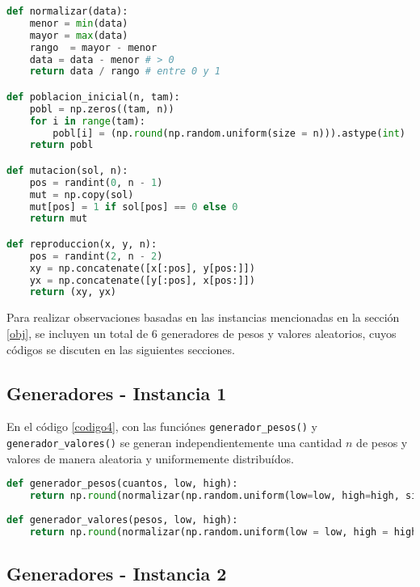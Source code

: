 \documentclass{article}
\begin{document}
\begin{lstlisting}[caption={Funciones Normalizar, Poblaci\'on Inicial, Mutaci\'on y Reproducci\'on}, label=codigo3, language=Python]
def normalizar(data):
    menor = min(data)
    mayor = max(data)
    rango  = mayor - menor
    data = data - menor # > 0
    return data / rango # entre 0 y 1

def poblacion_inicial(n, tam):
    pobl = np.zeros((tam, n))
    for i in range(tam):
        pobl[i] = (np.round(np.random.uniform(size = n))).astype(int)
    return pobl

def mutacion(sol, n):
    pos = randint(0, n - 1)
    mut = np.copy(sol)
    mut[pos] = 1 if sol[pos] == 0 else 0
    return mut

def reproduccion(x, y, n):
    pos = randint(2, n - 2)
    xy = np.concatenate([x[:pos], y[pos:]])
    yx = np.concatenate([y[:pos], x[pos:]])
    return (xy, yx)
\end{lstlisting}

Para realizar observaciones basadas en las instancias mencionadas en la secci\'on \ref{obj}, se incluyen un total de 6 generadores de pesos y valores aleatorios, cuyos c\'odigos se discuten en las siguientes secciones.

\subsection{Generadores - Instancia 1}

En el c\'odigo \ref{codigo4}, con las funci\'ones \texttt{generador\_pesos()} y \texttt{generador\_valores()} se generan independientemente una cantidad $n$ de pesos y valores de manera aleatoria y uniformemente distribu\'idos.

\begin{lstlisting}[caption={Generadores de Pesos y Valores de Instancia 1}, label=codigo4, language=Python]
def generador_pesos(cuantos, low, high):
    return np.round(normalizar(np.random.uniform(low=low, high=high, size = cuantos)) * (high - low) + low)
 
def generador_valores(pesos, low, high):
    return np.round(normalizar(np.random.uniform(low = low, high = high, size = pesos)) * (high - low) + low)
\end{lstlisting}

\subsection{Generadores - Instancia 2}
\end{document}

